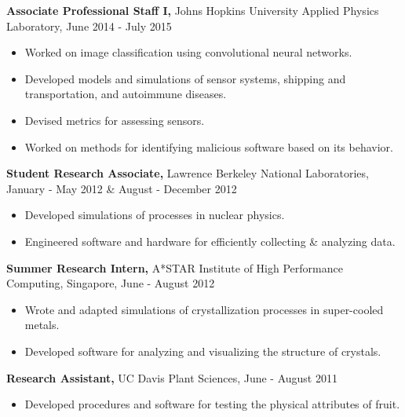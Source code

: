 \documentclass[margin]{res}
\begin{document}
\begin{resume}
\begin{itemize}
\end{itemize}\vspace{-8pt}
{\bf Associate Professional Staff I,} Johns Hopkins University Applied Physics Laboratory, June 2014 - July 2015 
\begin{itemize} \itemsep -2pt
 \item Worked on image classification using convolutional neural networks. \item Developed models and simulations of sensor systems, shipping and transportation, and autoimmune diseases. \item Devised metrics for assessing sensors. \item Worked on methods for identifying malicious software based on its behavior. \end{itemize}\vspace{-8pt}
 {\bf Student Research Associate,} Lawrence Berkeley National Laboratories, January - May 2012 \& August - December 2012
\begin{itemize} \itemsep -2pt
  \item Developed simulations of processes in nuclear physics. \item Engineered software and hardware for efficiently collecting \& analyzing data. \end{itemize}\vspace{-8pt}
{\bf Summer Research Intern,} A*STAR Institute of High Performance Computing, Singapore, June - August 2012
\begin{itemize} \itemsep -2pt
  \item Wrote and adapted simulations of crystallization processes in super-cooled metals. \item Developed software for analyzing and visualizing the structure of crystals. \end{itemize}\vspace{-8pt}
{\bf Research Assistant,} UC Davis Plant Sciences, June - August 2011
 \begin{itemize} \itemsep -2pt
  \item Developed procedures and software for testing the physical attributes of fruit. \end{itemize}


\end{resume}
\end{document}
